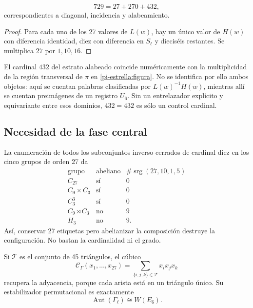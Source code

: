 \begin{theorem}
\label{p12-83-c20-s6:thm:particion-hensel-schlafli-nueva}
\begin{equation}
 729=27+270+432,
 \label{p12-83-c20-s6:eq:particion-729-e6-nueva}
\end{equation}
correspondientes a diagonal, incidencia y alabeamiento.
\end{theorem}

\begin{proof}
Para cada uno de los 27 valores de \(L(w)\), hay un único valor de
\(H(w)\) con diferencia identidad, diez con diferencia en \(S_\ell\) y
dieciséis restantes. Se multiplica \(27\) por \(1,10,16\).
\end{proof}

El cardinal \(432\) del estrato alabeado coincide numéricamente con la
multiplicidad de la región transversal de \(\pi\) en
\cref{pi-estrella:figura}. No se identifica por ello ambos objetos: aquí
se cuentan palabras clasificadas por \(L(w)^{-1}H(w)\), mientras allí se
cuentan preimágenes de un registro \(U_6\). Sin un entrelazador explícito y
equivariante entre esos dominios, \(432=432\) es sólo un control cardinal.



\subsection{Necesidad de la fase central}

La enumeración de todos los subconjuntos inverso-cerrados de cardinal diez
en los cinco grupos de orden 27 da
\[
\begin{array}{c|c|c}
\text{grupo}&\text{abeliano}&
\#\operatorname{srg}(27,10,1,5)\\ \hline
C_{27}&\text{sí}&0\\
C_9\times C_3&\text{sí}&0\\
C_3^3&\text{sí}&0\\
C_9\rtimes C_3&\text{no}&9\\
H_3&\text{no}&9.
\end{array}
\]
Así, conservar 27 etiquetas pero abelianizar la composición destruye la
configuración. No bastan la cardinalidad ni el grado.

Si \(\mathcal T\) es el conjunto de 45 triángulos, el cúbico
\[
 \mathcal C_\Gamma(x_1,\ldots,x_{27})
 =\sum_{\{i,j,k\}\in\mathcal T}x_ix_jx_k
\]
recupera la adyacencia, porque cada arista está en un triángulo único. Su
estabilizador permutacional es exactamente
\[
 \operatorname{Aut}(\Gamma_\ell)\cong W(E_6).
\]

